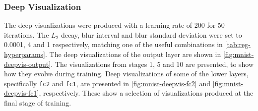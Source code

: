 \subsubsection{Deep Visualization}

The deep visualizations were produced with a learning rate of 200 for 50 iterations. The $L_2$ decay, blur interval and blur standard deviation were set to 0.0001, 4 and 1 respectively, matching one of the useful combinations in \autoref{tab:reg-hyperparams}. The deep visualizations of the output layer are shown in \autoref{fig:mnist-deepvis-output}. The visualizations from stages 1, 5 and 10 are presented, to show how they evolve during training. Deep visualizations of some of the lower layers, specifically \texttt{fc2} and \texttt{fc1}, are presented in \autoref{fig:mnist-deepvis-fc2} and \autoref{fig:mnist-deepvis-fc1}, respectively. These show a selection of visualizations produced at the final stage of training.

